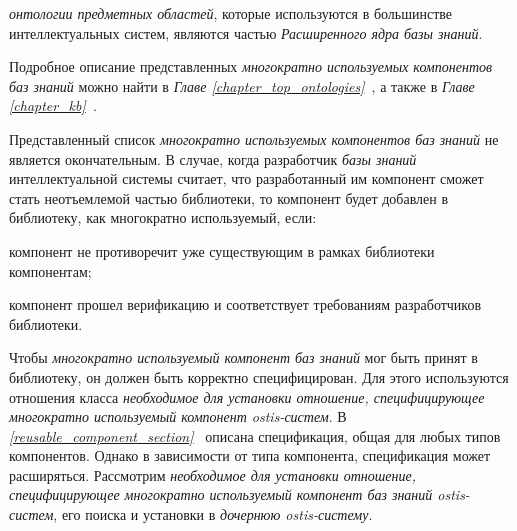 \textit{онтологии предметных областей}, которые используются в большинстве интеллектуальных систем, являются частью \textit{Расширенного ядра базы знаний}.

\begin{SCn}
\begin{scnindent}
\end{scnindent}
\end{SCn}

Подробное описание представленных \textit{многократно используемых компонентов баз знаний} можно найти в \textit{Главе \ref{chapter_top_ontologies}~}, а также в \textit{Главе \ref{chapter_kb}~}.

Представленный список \textit{многократно используемых компонентов баз знаний} не является окончательным. В случае, когда разработчик \textit{базы знаний} интеллектуальной системы считает, что разработанный им компонент сможет стать неотъемлемой частью библиотеки, то компонент будет добавлен в библиотеку, как многократно используемый, если:
\begin{textitemize}
		\item компонент не противоречит уже существующим в рамках библиотеки компонентам;
		\item компонент прошел верификацию и соответствует требованиям разработчиков библиотеки.
\end{textitemize}

Чтобы \textit{многократно используемый компонент баз знаний} мог быть принят в библиотеку, он должен быть корректно специфицирован. Для этого используются отношения класса \textit{необходимое для установки отношение, специфицирующее многократно используемый компонент ostis-систем}. В \textit{\ref{reusable_component_section}~} описана спецификация, общая для любых типов компонентов. Однако в зависимости от типа компонента, спецификация может расширяться. Рассмотрим \textit{необходимое для установки отношение, специфицирующее многократно используемый компонент баз знаний ostis-систем}, его поиска и установки в \textit{дочернюю ostis-систему}.

